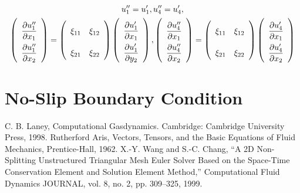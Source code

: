 \documentclass[a4paper,12pt,dvips]{article}
\begin{document}
\begin{gather*}
  u''_1 = u'_1, u''_4 = u'_4,
  \\
  \renewcommand{\arraystretch}{2.2}
  \left(\begin{array}{c}
    \dfrac{\partial u''_1}{\partial x_1} \\
    \dfrac{\partial u''_1}{\partial x_2}
  \end{array}\right)
  = \left(\begin{array}{ccc}
    \xi_{11} & \xi_{12} \\
    \xi_{21} & \xi_{22}
  \end{array}\right)
  \left(\begin{array}{c}
    \dfrac{\partial u'_1}{\partial x_1} \\
    \dfrac{\partial u'_1}{\partial y_2}
  \end{array}\right),
  \left(\begin{array}{c}
    \dfrac{\partial u''_4}{\partial x_1} \\
    \dfrac{\partial u''_4}{\partial x_2}
  \end{array}\right)
  = \left(\begin{array}{ccc}
    \xi_{11} & \xi_{12} \\
    \xi_{21} & \xi_{22}
  \end{array}\right)
  \left(\begin{array}{c}
    \dfrac{\partial u'_4}{\partial x_1} \\
    \dfrac{\partial u'_4}{\partial x_2}
  \end{array}\right)
\end{gather*}

\section{No-Slip Boundary Condition}

\begin{thebibliography}{99}
 C. B. Laney, Computational Gasdynamics.
Cambridge: Cambridge University Press, 1998.
 Rutherford Aris, Vectors, Tensors, and the Basic
Equations of Fluid Mechanics, Prentice-Hall, 1962.
 X.-Y. Wang and S.-C. Chang, ``A 2D Non-Splitting
Unstructured Triangular Mesh Euler Solver Based on the Space-Time Conservation
Element and Solution Element Method,'' Computational Fluid Dynamics JOURNAL,
vol. 8, no. 2, pp. 309–325, 1999.
\end{thebibliography}
\end{document}
